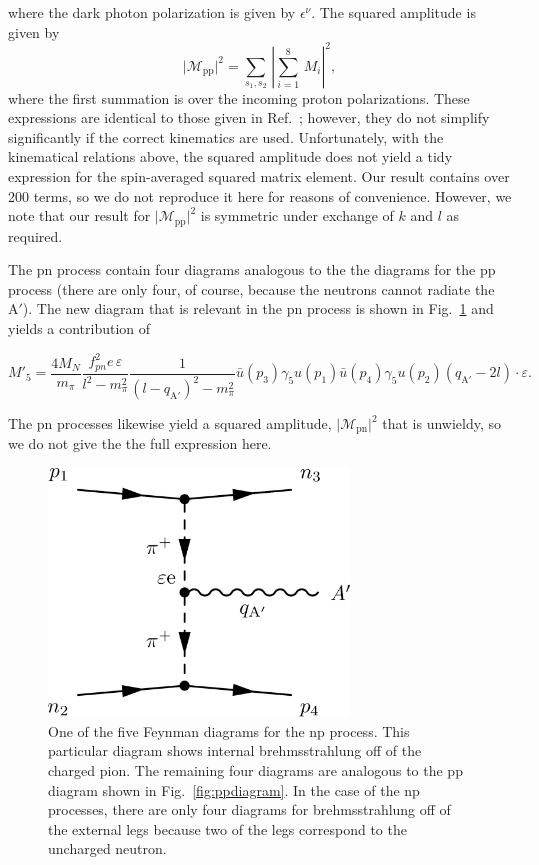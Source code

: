 \documentclass[nofootinbib,prd,superscriptaddress,twocolumn]{revtex4}
\newcommand{\qa}{q_{\mathrm{A}'}}
\newcommand{\Aprime}{\mathrm{A}'}
\begin{document}
%
where the dark photon polarization is given by $\epsilon^{\nu}$. The squared amplitude is given by 
%
\begin{equation}
\vert \mathcal{M}_{\mathrm{pp}} \vert^2 = \sum_{s_1,s_2}\, \left\vert \sum_{i=1}^{8}\, M_i \right\vert^2, 
\end{equation}
%
where the first summation is over the incoming proton polarizations. These expressions are identical to those 
given in Ref.~\cite{dent_etal12}; however, they do not simplify significantly if the correct kinematics are used. 
Unfortunately, with the kinematical relations above, the squared amplitude does not yield a tidy expression 
for the spin-averaged squared matrix element. Our result 
contains over 200 terms, so we do not reproduce it here for reasons of convenience. However, we note that 
our result for $\vert \mathcal{M}_{\mathrm{pp}} \vert^2$ is symmetric under exchange of $k$ and $l$ as required. 

The pn process contain four diagrams analogous to the the diagrams for the pp process (there are only four, of course, 
because the neutrons cannot radiate the $\Aprime$). The new diagram that is relevant in the pn process is shown in 
Fig.~\ref{fig:npdiagram} and yields a contribution of 
%
\begin{widetext}
\begin{equation}
M'_5 = \frac{4 M_N}{ m_\pi} \frac{f_{pn}^2 e\, \varepsilon}{l^2-m_\pi^2}  \frac{1}{(l-\qa)^2 - m_\pi^2} 
\bar{u}(p_3) \gamma_5 u(p_1) \bar{u}(p_4) \gamma_5 u(p_2) (\qa - 2l)\cdot \varepsilon.
\end{equation}
\end{widetext}
%
The pn processes likewise yield a squared amplitude, 
$\vert \mathcal{M}_{\mathrm{pn}} \vert^2$ that is unwieldy, so we do not give the 
the full expression here. 


\begin{figure}
\includegraphics[width=8cm]{npdiagram.pdf}
\caption{One of the five Feynman diagrams for the np process. This particular diagram shows 
internal brehmsstrahlung off of the charged pion. The remaining four diagrams are analogous to the 
pp diagram shown in Fig.~\ref{fig:ppdiagram}. In the case of the np processes, there are only four 
diagrams for brehmsstrahlung off of the external legs because two of the legs correspond to the 
uncharged neutron.}
\label{fig:npdiagram}
\end{figure}
\end{document}
